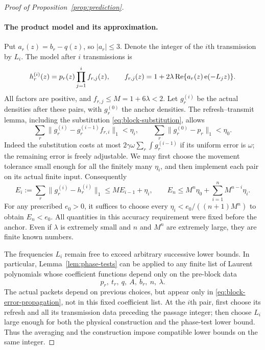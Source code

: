 \begin{proof}[Proof of Proposition~\ref{prop:prediction}]
\paragraph{The product model and its approximation.}
Put $a_r(z)=b_r-q(z)$, so $|a_r|\le3$.  Denote the integer of the
$i$th transmission by $L_i$.  The model after $i$ transmissions is
\begin{equation}
 h_r^{(i)}(z)=p_r(z)\prod_{j=1}^i f_{r,j}(z),\qquad
 f_{r,j}(z)=1+2\lambda\operatorname{Re}\{a_r(z)\operatorname{e}(-L_jz)\}.
 \label{eq:block-model}
\end{equation}
All factors are positive, and $f_{r,j}\le M=1+6\lambda<2$.
Let $g_r^{(i)}$ be the actual densities after these pairs, with
$g_r^{(0)}$ the anchor densities.  The refresh--transmit lemma,
including the substitution \eqref{eq:block-substitution}, allows
\[
 \sum_r\|g_r^{(i)}-g_r^{(i-1)}f_{r,i}\|_1<\eta_i,
 \qquad
 \sum_r\|g_r^{(0)}-p_r\|_1<\eta_0.
\]
Indeed the substitution costs at most
$2\gamma\omega\sum_r\int g_r^{(i-1)}$ if its uniform error is
$\omega$; the remaining error is freely adjustable.  We may first
choose the movement tolerance small enough for all the finitely many
$\eta_i$, and then implement each pair on its actual finite input.
Consequently
\begin{equation}
 E_i:=\sum_r\|g_r^{(i)}-h_r^{(i)}\|_1
 \le ME_{i-1}+\eta_i,
 \qquad
 E_n\le M^n\eta_0+\sum_{i=1}^nM^{n-i}\eta_i.
 \label{eq:block-error-propagation}
\end{equation}
For any prescribed $e_0>0$, it suffices to choose every
$\eta_i<e_0/((n+1)M^n)$ to obtain $E_n<e_0$.
All quantities in this accuracy requirement were fixed before the
anchor.  Even if $\lambda$ is extremely small and $n$ and $M^n$ are
extremely large, they are finite known numbers.

The frequencies $L_i$ remain free to exceed arbitrary successive
lower bounds.  In particular, Lemma~\ref{lem:phase-tests} can be
applied to any finite list of Laurent polynomials whose coefficient
functions depend only on the pre-block data
\begin{equation}
 p_r,\ t_r,\ q,\ A,\ b_r,\ n,\ \lambda.
 \label{eq:block-fixed-data}
\end{equation}
The actual packets depend on previous choices, but appear only in
\eqref{eq:block-error-propagation}, not in this fixed coefficient
list.  At the $i$th pair, first choose its refresh and all its
transmission data preceding the passage integer; then choose $L_i$
large enough for both the physical construction and the phase-test
lower bound.  Thus the averaging and the construction impose
compatible lower bounds on the same integer.


\end{proof}
